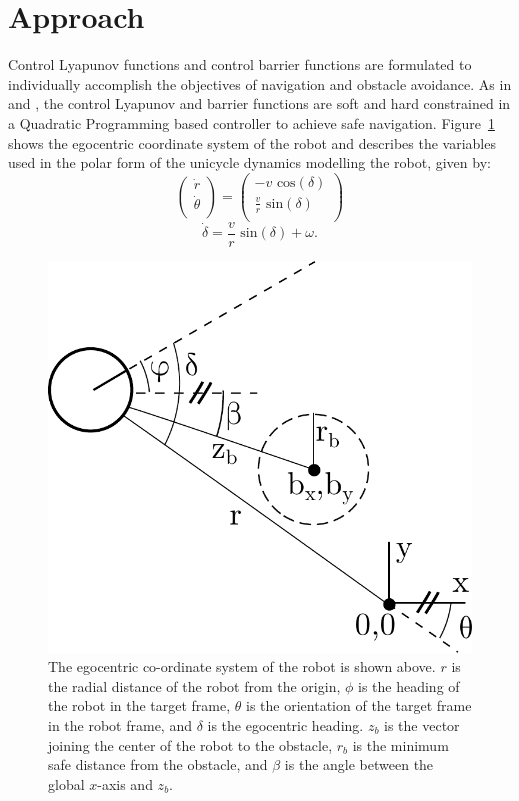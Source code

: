 \documentclass[conference]{IEEEtran}
\begin{document}
\section{Approach}
Control Lyapunov functions and control barrier functions are formulated to individually accomplish the objectives of navigation and obstacle avoidance. As in \cite{amesACC} and \cite{ames2014esclf}, the control Lyapunov and barrier functions are soft and hard constrained in a Quadratic Programming based controller to achieve safe navigation. Figure~\ref{fig:obs} shows the egocentric coordinate system of the robot and describes the variables used in the polar form of the unicycle dynamics modelling the robot, given by: 
\begin{equation}
\left(
\begin{matrix}
\dot{r}\\
\dot{\theta}\\
\end{matrix}
\right)
=
\left(
\begin{matrix}
- v \text{ cos}(\delta)\\
\frac{v}{r} \text{ sin}(\delta)\\
\end{matrix}
\right)
\end{equation}
\begin{equation}
\dot{\delta}=\frac{v}{r} \text{ sin}(\delta)+\omega.
\end{equation}
\begin{figure}[t]
\begin{center}
\includegraphics[scale=0.35]{obs.pdf} 
\caption{The egocentric co-ordinate system of the robot is shown above. $r$ is the radial distance of the robot from the origin, $\phi$ is the heading of the robot in the target frame, $\theta$ is the orientation of the target frame in the robot frame, and $\delta$ is  the egocentric heading. $z_b$ is the vector joining the center of the robot to the obstacle,  $r_b$ is the minimum safe distance from the obstacle, and $\beta$ is the angle between the global $x$-axis and $z_b$. \label{fig:obs}} 
\end{center}
\end{figure}
\end{document}
